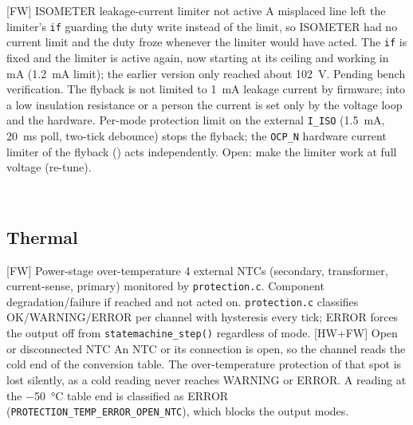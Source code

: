 \begin{FMEATable}
    \FMEAItemCritical
        {[FW] ISOMETER leakage-current limiter not active}
        {A misplaced line left the limiter's \texttt{if} guarding the duty write instead of the limit, so ISOMETER had no current limit and the duty froze whenever the limiter would have acted. The \texttt{if} is fixed and the limiter is active again, now starting at its ceiling and working in mA (\qty{1.2}{\milli\ampere} limit); the earlier version only reached about \qty{102}{\volt}. Pending bench verification.}
        {The flyback is not limited to \qty{1}{\milli\ampere} leakage current by firmware; into a low insulation resistance or a person the current is set only by the voltage loop and the hardware.}
        {Per-mode protection limit on the external \texttt{I\_ISO} (\qty{1.5}{\milli\ampere}, \qty{20}{\milli\second} poll, two-tick debounce) stops the flyback; the \texttt{OCP\_N} hardware current limiter of the flyback () acts independently. Open: make the limiter work at full voltage (re-tune). }
    \caption{FMEA -- Isolation measurement} \\
    \end{FMEATable}

\FloatBarrier

\subsection{Thermal}

    \begin{FMEATable}
    \FMEAItemModerate
        {[FW] Power-stage over-temperature}
        {4 external \ac{NTC}s (secondary, transformer, current-sense, primary) monitored by \texttt{protection.c}.}
        {Component degradation/failure if reached and not acted on.}
        {\texttt{protection.c} classifies OK/WARNING/ERROR per channel with hysteresis every tick; ERROR forces the output off from \texttt{statemachine\_step()} regardless of mode.}
    \FMEAItemModerate
        {[HW+FW] Open or disconnected \acs{NTC}}
        {An \ac{NTC} or its connection is open, so the channel reads the cold end of the conversion table.}
        {The over-temperature protection of that spot is lost silently, as a cold reading never reaches WARNING or ERROR.}
        {A reading at the \qty{-50}{\celsius} table end is classified as ERROR (\texttt{PROTECTION\_TEMP\_ERROR\_OPEN\_NTC}), which blocks the output modes. }
    \caption{FMEA -- Thermal} \\
    \end{FMEATable}

